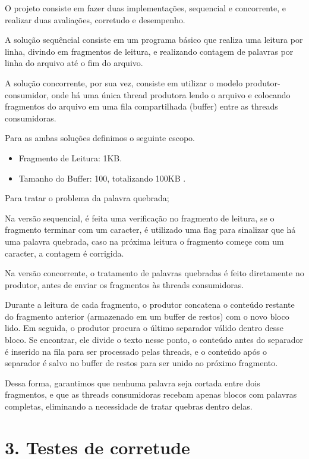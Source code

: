 \documentclass{article}
\begin{document}
O projeto consiste em fazer duas implementações, sequencial e concorrente, e realizar duas avaliações, corretudo e desempenho.

A solução sequêncial consiste em um programa básico que realiza uma leitura por linha, divindo em fragmentos de leitura, e realizando contagem de palavras por linha do arquivo até o fim do arquivo.

A solução concorrente, por sua vez, consiste em utilizar o modelo produtor-consumidor, onde há uma única thread produtora lendo o arquivo e colocando fragmentos do arquivo em uma fila compartilhada (buffer) entre as threads consumidoras.

Para as ambas soluções definimos o seguinte escopo.
\begin{itemize}
    \item Fragmento de Leitura: 1KB.
    \item Tamanho do Buffer: 100, totalizando 100KB  .
\end{itemize}

Para tratar o problema da palavra quebrada;

Na versão sequencial, é feita uma verificação no fragmento de leitura, se o fragmento terminar com um caracter, é utilizado uma flag para sinalizar que há uma palavra quebrada, caso na próxima leitura o fragmento começe com um caracter, a contagem é corrigida.

Na versão concorrente, o tratamento de palavras quebradas é feito diretamente no produtor, antes de enviar os fragmentos às threads consumidoras.

Durante a leitura de cada fragmento, o produtor concatena o conteúdo restante do fragmento anterior (armazenado em um buffer de restos) com o novo bloco lido.
Em seguida, o produtor procura o último separador válido dentro desse bloco.
Se encontrar, ele divide o texto nesse ponto, o conteúdo antes do separador é inserido na fila para ser processado pelas threads, e o conteúdo após o separador é salvo no buffer de restos para ser unido ao próximo fragmento.

Dessa forma, garantimos que nenhuma palavra seja cortada entre dois fragmentos, e que as threads consumidoras recebam apenas blocos com palavras completas, eliminando a necessidade de tratar quebras dentro delas.

\section*{3. Testes de corretude}
\end{document}
